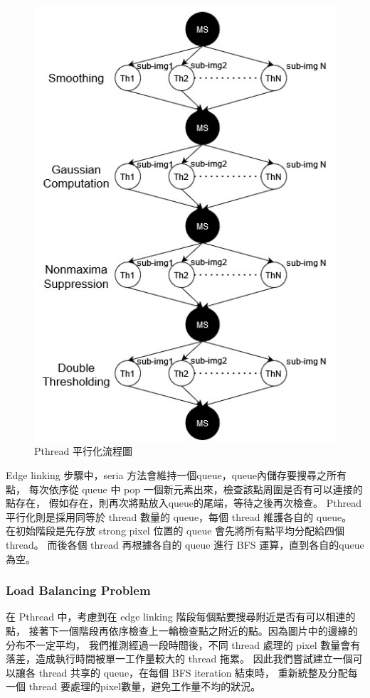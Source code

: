\documentclass[sigconf,nonacm]{acmart}
\begin{document}
\begin{figure}[h]
  \centering
  \includegraphics[width=0.8\linewidth]{"./image/pthread_strategy.jpg"}
  \caption{Pthread 平行化流程圖}
  \label{fig:pthread}
\end{figure}

Edge linking 步驟中，seria 方法會維持一個queue，queue內儲存要搜尋之所有點，
每次依序從 queue 中 pop 一個新元素出來，檢查該點周圍是否有可以連接的點存在，
假如存在，則再次將點放入queue的尾端，等待之後再次檢查。
Pthread 平行化則是採用同等於 thread 數量的 queue，每個 thread 維護各自的 queue。
在初始階段是先存放 strong pixel 位置的 queue 會先將所有點平均分配給四個 thread。
而後各個 thread 再根據各自的 queue 進行 BFS 運算，直到各自的queue為空。

\subsubsection{Load Balancing Problem} \label{load_balancing}

在 Pthread 中，考慮到在 edge linking 階段每個點要搜尋附近是否有可以相連的點，
接著下一個階段再依序檢查上一輪檢查點之附近的點。因為圖片中的邊緣的分布不一定平均，
我們推測經過一段時間後，不同 thread 處理的 pixel 數量會有落差，造成執行時間被單一工作量較大的 thread 拖累。
因此我們嘗試建立一個可以讓各 thread 共享的 queue，在每個 BFS iteration 結束時，
重新統整及分配每一個 thread 要處理的pixel數量，避免工作量不均的狀況。
\end{document}
